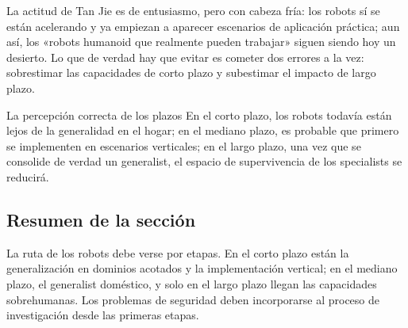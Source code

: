 La actitud de Tan Jie es de entusiasmo, pero con cabeza fría: los robots sí se están acelerando y ya empiezan a aparecer escenarios de aplicación práctica; aun así, los «robots humanoid que realmente pueden trabajar» siguen siendo hoy un desierto. Lo que de verdad hay que evitar es cometer dos errores a la vez: sobrestimar las capacidades de corto plazo y subestimar el impacto de largo plazo.

\begin{importantbox}{La percepción correcta de los plazos}
En el corto plazo, los robots todavía están lejos de la generalidad en el hogar; en el mediano plazo, es probable que primero se implementen en escenarios verticales; en el largo plazo, una vez que se consolide de verdad un generalist, el espacio de supervivencia de los specialists se reducirá.
\end{importantbox}

\subsection{Resumen de la sección}

La ruta de los robots debe verse por etapas. En el corto plazo están la generalización en dominios acotados y la implementación vertical; en el mediano plazo, el generalist doméstico, y solo en el largo plazo llegan las capacidades sobrehumanas. Los problemas de seguridad deben incorporarse al proceso de investigación desde las primeras etapas.
